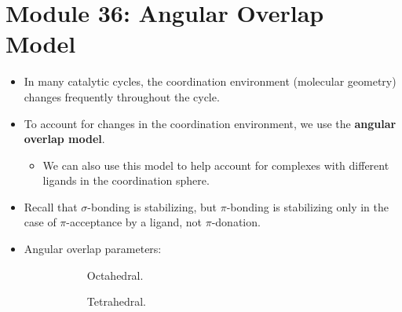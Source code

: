 \documentclass[../notes.tex]{subfiles}
\begin{document}
\section{Module 36: Angular Overlap Model}
\begin{itemize}
    \item In many catalytic cycles, the coordination environment (molecular geometry) changes frequently throughout the cycle.
    \item To account for changes in the coordination environment, we use the \textbf{angular overlap model}.
    \begin{itemize}
        \item We can also use this model to help account for complexes with different ligands in the coordination sphere.
    \end{itemize}
    \item Recall that $\sigma$-bonding is stabilizing, but $\pi$-bonding is stabilizing only in the case of $\pi$-acceptance by a ligand, not $\pi$-donation.
    \item Angular overlap parameters:
    \begin{figure}[h!]
        \centering
        \begin{subfigure}[b]{0.3\linewidth}
            \centering
            \caption{Octahedral.}
            \label{fig:AOM-positionLabelinga}
        \end{subfigure}
        \begin{subfigure}[b]{0.3\linewidth}
            \centering
            \caption{Tetrahedral.}
            \label{fig:AOM-positionLabelingb}
        \end{subfigure}
        \begin{subfigure}[b]{0.3\linewidth}
            \centering
\end{subfigure}
\end{figure}
\end{itemize}
\end{document}
